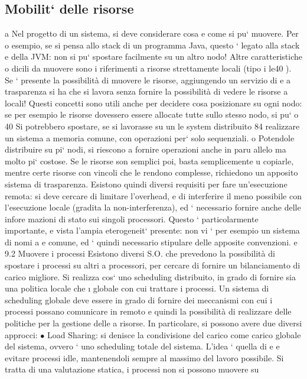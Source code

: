 \documentclass[a4paper,12pt]{article}
\begin{document}
\subsection{Mobilit` delle risorse}
a
Nel progetto di un sistema, si deve considerare cosa e come si pu` muovere. Per
o
esempio, se si pensa allo stack di un programma Java, questo ` legato alla stack
e
della JVM: non si pu` spostare facilmente su un altro nodo! Altre caratteristiche
o
dicili da muovere sono i riferimenti a risorse strettamente locali (tipo i le40 ).
Se ` presente la possibilità di muovere le risorse, aggiungendo un servizio di
e
a
trasparenza si ha che si lavora senza fornire la possibilità di vedere le risorse
a
locali!
Questi concetti sono utili anche per decidere cosa posizionare su ogni nodo:
se per esempio le risorse dovessero essere allocate tutte sullo stesso nodo, si pu`
o
40 Si
potrebbero spostare, se si lavorasse su un le system distribuito
84
realizzare un sistema a memoria comune, con operazioni per` solo sequenziali.
o
Potendole distribuire su pi` nodi, si riescono a fornire operazioni anche in paru
allelo ma molto pi` costose. Se le risorse son semplici poi, basta semplicemente
u
copiarle, mentre certe risorse con vincoli che le rendono complesse, richiedono
un apposito sistema di trasparenza.
Esistono quindi diversi requisiti per fare un'esecuzione remota: si deve cercare di limitare l'overhead, e di
interferire il meno possibile con l'esecuzione
locale (gradita la non-interferenza), ed ` necessario fornire anche delle infore
mazioni di stato sui singoli processori. Questo ` particolarmente importante,
e
vista l'ampia eterogeneit` presente: non vi ` per esempio un sistema di nomi
a
e
comune, ed ` quindi necessario stipulare delle apposite convenzioni.
e
9.2
Muovere i processi
Esistono diversi S.O. che prevedono la possibilità di spostare i processi su altri
a
processori, per cercare di fornire un bilanciamento di carico migliore. Si realizza
cos` uno scheduling distribuito, in grado di fornire sia una politica locale che
\i{}
globale con cui trattare i processi. Un sistema di scheduling globale deve essere
in grado di fornire dei meccanismi con cui i processi possano comunicare in
remoto e quindi la possibilità di realizzare delle politiche per la gestione delle
a
risorse.
In particolare, si possono avere due diversi approcci:
$\bullet$ Load Sharing: si denisce la condivisione del carico come carico globale
del sistema, ovvero ` uno scheduling totale del sistema. L'idea ` quella di
e
e
evitare processi idle, mantenendoli sempre al massimo del lavoro possibile.
Si tratta di una valutazione statica, i processi non si possono muovere su
\end{document}
